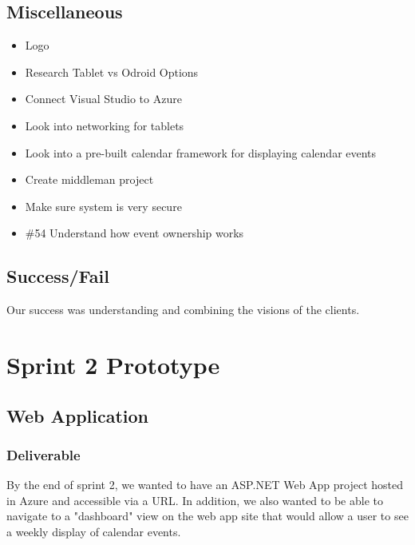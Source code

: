 \subsection*{Miscellaneous}
\begin{itemize}
\item Logo
\item Research Tablet vs Odroid Options
\item Connect Visual Studio to Azure
\item Look into networking for tablets
\item Look into a pre-built calendar framework for displaying calendar events
\item Create middleman project
\item Make sure system is very secure
\item \#54 Understand how event ownership works
\end{itemize}

\subsection{Success/Fail}
Our success was understanding and combining the visions of the clients.


\section{Sprint 2 Prototype}
\subsection{Web Application}
\subsubsection{Deliverable}
By the end of sprint 2, we wanted to have an ASP.NET Web App project hosted in Azure and accessible via a URL. In addition, we also wanted to be able to navigate to a "dashboard" view on the web app site that would allow a user to see a weekly display of calendar events.

